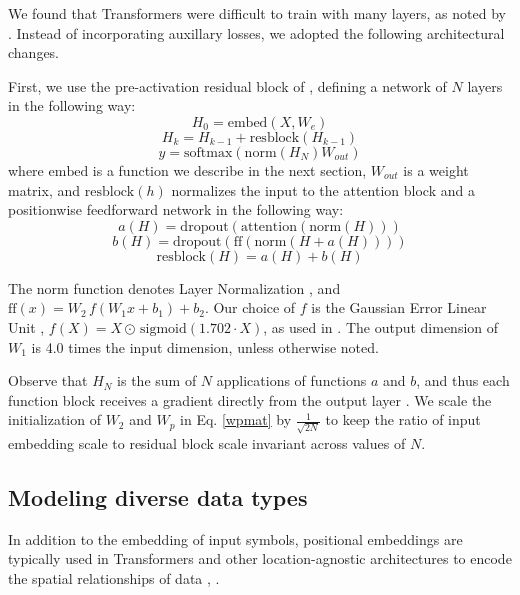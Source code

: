 \documentclass{article}
\begin{document}
We found that Transformers were difficult to train with many layers, as noted by \cite{al2018character}. Instead of incorporating auxillary losses, we adopted the following architectural changes.

First, we use the pre-activation residual block of \cite{He2016}, defining a network of $N$ layers in the following way:
\begin{equation}H_0 = \mathrm{embed}(X, W_e)\end{equation}
\begin{equation}H_k = H_{k-1} + \mathrm{resblock}(H_{k-1})\end{equation}
\begin{equation}y = \mathrm{softmax}(\mathrm{norm}(H_N) W_{out})\end{equation}
where $\mathrm{embed}$ is a function we describe in the next section, $W_{out}$ is a weight matrix, and $\mathrm{resblock}(h)$ normalizes the input to the attention block and a positionwise feedforward network in the following way:
\begin{equation}a(H) = \mathrm{dropout}(\mathrm{attention}(\mathrm{norm}(H)))\end{equation}
\begin{equation}b(H) = \mathrm{dropout}(\mathrm{ff}(\mathrm{norm}(H + a(H))))\end{equation}
\begin{equation}\mathrm{resblock}(H) = a(H) + b(H) \end{equation}

The $\mathrm{norm}$ function denotes Layer Normalization \cite{ba2016layer}, and $\mathrm{ff}(x) = W_2 \, f(W_1x + b_1) + b_2$. Our choice of $f$ is the Gaussian Error Linear Unit \cite{hendrycks2016bridging}, $f(X) = X \odot \, \mathrm{sigmoid}(1.702 \cdot X)$, as used in \cite{radford2018}. The output dimension of $W_1$ is 4.0 times the input dimension, unless otherwise noted.

Observe that $H_N$ is the sum of $N$ applications of functions $a$ and $b$, and thus each function block receives a gradient directly from the output layer . We scale the initialization of $W_2$ and $W_p$ in Eq. \ref{wpmat} by $\frac{1}{\sqrt{2N}}$ to keep the ratio of input embedding scale to residual block scale invariant across values of $N$. 


\subsection{Modeling diverse data types}
In addition to the embedding of input symbols, positional embeddings are typically used in Transformers and other location-agnostic architectures to encode the spatial relationships of data \cite{gehring2017convolutional}, \cite{parmar2018image}.
\end{document}
